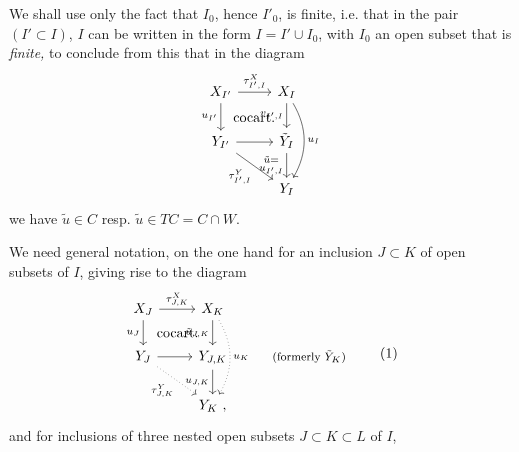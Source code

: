 \documentclass[11pt]{article}
\newcommand{\msp}[1]{\marginpar{\footnotesize [#1]}}
\newcommand{\cocart}{\textup{cocart.}}
\begin{document}
We shall use only the fact that $I_0$, hence $I'_0$, is finite, i.e. that in the pair $(I' \subset I)$, $I$ can be written in the form $I = I' \cup I_0$, with $I_0$ an open subset that is \textit{finite,} to conclude from this that in the diagram
\[
\begin{tikzcd}
X_{I'} \arrow[r, "\tau^X_{I',I}"] \arrow[d, "u_{I'}"'] \arrow[dr, phantom, "\cocart"] & X_I \arrow[d, "v_{I',I}"'] \arrow[dd, bend left=30, "u_I"] \\
Y_{I'} \arrow[r] \arrow[dr, "\tau^Y_{I',I}"'] & \tilde{Y}_I \arrow[d, "\substack{\tilde{u} =\\ u_{I',I}}"'] \\
& Y_I
\end{tikzcd}
\]
we have $\tilde{u} \in C$ resp. $\tilde{u} \in TC = C \cap W$.

\msp{page 14}

We need general notation, on the one hand for an inclusion $J \subset K$ of open subsets of $I$, giving rise to the diagram
\[
\begin{tikzcd}
X_J \arrow[r, "\tau^X_{J,K}"] \arrow[d, "u_J"'] \arrow[dr, phantom, "\cocart"] & X_K \arrow[d, "\tilde{u}_{J,K}"'] \arrow[dd, dotted, bend left=30, "u_K"] & \\
Y_J \arrow[r] \arrow[dr, dotted, "\tau^Y_{J,K}"'] & Y_{J,K} \arrow[d, "u_{J,K}"'] & \text{\footnotesize (formerly $\tilde{Y}_K$)} \\
& Y_K\ , &
\end{tikzcd}
\tag*{(1)}
\]
and for inclusions of three nested open subsets $J \subset K \subset L$ of $I$,
\end{document}
